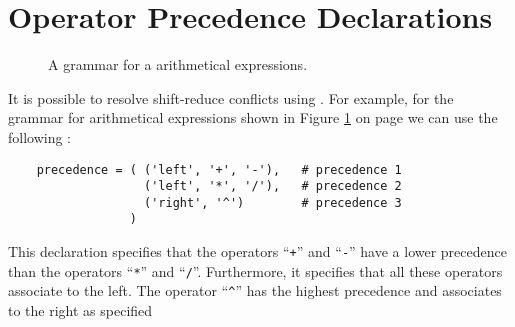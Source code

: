 \section{Operator Precedence Declarations \label{section:operator-precedence}}
\begin{figure}[!ht]

  \begin{center}    
  \end{center}
  \caption{A grammar for a arithmetical expressions.}
  \label{fig:grammar-resolved.g}
\end{figure}
It is possible to resolve shift-reduce conflicts using .
For example, for the grammar for arithmetical expressions shown in Figure \ref{fig:grammar-resolved.g}
on page \pageref{fig:grammar-resolved.g} we can use the following :
\begin{verbatim}
    precedence = ( ('left', '+', '-'),   # precedence 1
                   ('left', '*', '/'),   # precedence 2
                   ('right', '^')        # precedence 3
                 )
\end{verbatim}
This declaration specifies that the operators ``\texttt{+}'' and ``\texttt{-}'' have a lower precedence than
the operators  ``\texttt{*}'' and ``\texttt{/}''.  Furthermore, it specifies that all these operators associate
to the left.  The operator ``\texttt{\^}'' has the highest precedence and associates to the right as specified

